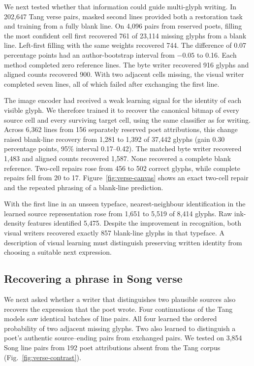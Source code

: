 \documentclass[12pt,a4paper]{article}
\providecommand{\DIFadd}[1]{{\protect\color{blue} \sf #1}} %
\begin{document}
\DIFadd{We next tested whether that information could guide multi-glyph writing. In 202,647 Tang verse pairs, masked second lines provided both a restoration task and training from a fully blank line. On 4,096 pairs from reserved poets, filling the most confident cell first recovered 761 of 23,114 missing glyphs from a blank line. Left-first filling with the same weights recovered 744. The difference of 0.07 percentage points had an author-bootstrap interval from $-0.05$ to 0.16. Each method completed zero reference lines. The byte writer recovered 916 glyphs and aligned counts recovered 900. With two adjacent cells missing, the visual writer completed seven lines, all of which failed after exchanging the first line.
}

\DIFadd{The image encoder had received a weak learning signal for the identity of each visible glyph. We therefore trained it to recover the canonical bitmap of every source cell and every surviving target cell, using the same classifier as for writing. Across 6,362 lines from 156 separately reserved poet attributions, this change raised blank-line recovery from 1,281 to 1,392 of 37,442 glyphs (gain 0.30 percentage points, 95\% interval 0.17--0.42). The matched byte writer recovered 1,483 and aligned counts recovered 1,587. None recovered a complete blank reference. Two-cell repairs rose from 456 to 502 correct glyphs, while complete repairs fell from 20 to 17. Figure~\ref{fig:verse-canvas} shows an exact two-cell repair and the repeated phrasing of a blank-line prediction.
}

\DIFadd{With the first line in an unseen typeface, nearest-neighbour identification in the learned source representation rose from 1,651 to 5,519 of 8,414 glyphs. Raw ink-density features identified 5,475. Despite the improvement in recognition, both visual writers recovered exactly 857 blank-line glyphs in that typeface. A description of visual learning must distinguish preserving written identity from choosing a suitable next expression.
}


\subsection*{\DIFadd{Recovering a phrase in Song verse}}
\DIFadd{We next asked whether a writer that distinguishes two plausible sources also recovers the expression that the poet wrote. Four continuations of the Tang models saw identical batches of line pairs. All four learned the ordered probability of two adjacent missing glyphs. Two also learned to distinguish a poet's authentic source--ending pairs from exchanged pairs. We tested on 3,854 Song line pairs from 192 poet attributions absent from the Tang corpus (Fig.~\ref{fig:verse-contrast}).
}
\end{document}
